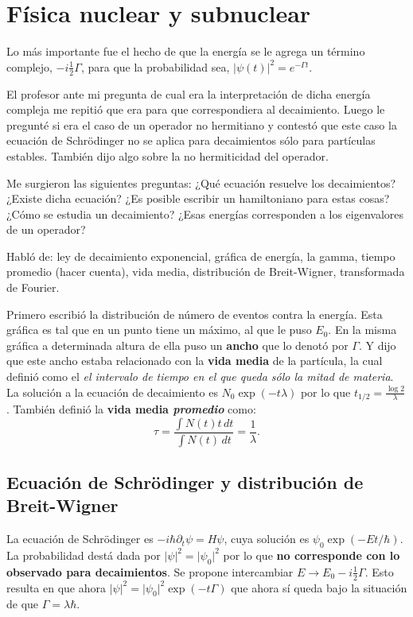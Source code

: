 \section{Física nuclear y subnuclear}
Lo más importante fue el hecho de que la energía se le
agrega un término complejo, $-i \frac{1}{2} \Gamma$, para
que la probabilidad sea, $\vert \psi(t) \vert^2 = e^{-\Gamma
t}$.

El profesor ante mi pregunta de cual era la interpretación
de dicha energía compleja me repitió que era para que
correspondiera al decaimiento. Luego le pregunté si era el
caso de un operador no hermitiano y contestó que este caso
la ecuación de Schrödinger no se aplica para decaimientos
sólo para partículas estables. También dijo algo sobre la no
hermiticidad del operador.

Me surgieron las siguientes preguntas: ¿Qué ecuación
resuelve los decaimientos? ¿Existe dicha ecuación? ¿Es
posible escribir un hamiltoniano para estas cosas? ¿Cómo se
estudia un decaimiento? ¿Esas energías corresponden a los
eigenvalores de un operador?

Habló de: ley de decaimiento exponencial, gráfica de
energía, la gamma, tiempo promedio (hacer cuenta), vida
media, distribución de Breit-Wigner, transformada de
Fourier.

Primero escribió la distribución de número de eventos contra
la energía. Esta gráfica es tal que en un punto tiene un
máximo, al que le puso $E_0$. En la misma gráfica a
determinada altura de ella puso un \textbf{ancho} que lo
denotó por $\Gamma$. Y dijo que este ancho estaba
relacionado con la \textbf{vida media} de la partícula, la cual
definió como el \emph{el intervalo de tiempo en el que queda
sólo la mitad de materia}. La solución a la ecuación de
decaimiento es $N_0 \exp(-t \lambda)$ por lo que $t_{1/2} =
\frac{\log 2}{\lambda}$. También definió la \textbf{vida
media \textsl{promedio}} como:
\[
  \tau = \frac{\int N(t) t\, dt}{\int N(t) \, dt} =
  \frac{1}{\lambda}.
\]

\subsection{Ecuación de Schrödinger y distribución de
Breit-Wigner}

La ecuación de Schrödinger es $-i\hbar\partial_t \psi = H
\psi$, cuya solución es $\psi_0 \exp(-E t /\hbar)$. La
probabilidad destá dada por $\vert \psi \vert^2 = \vert
\psi_0 \vert^2$ por lo que \textbf{no corresponde con lo
observado para decaimientos}. Se propone intercambiar $E \to
E_0 - i\frac{1}{2} \Gamma$. Esto resulta en que ahora $\vert
\psi \vert^2 = \vert \psi_0\vert^2 \exp(-t \Gamma)$ que
ahora sí queda bajo la situación de que $\Gamma = \lambda
\hbar$.

